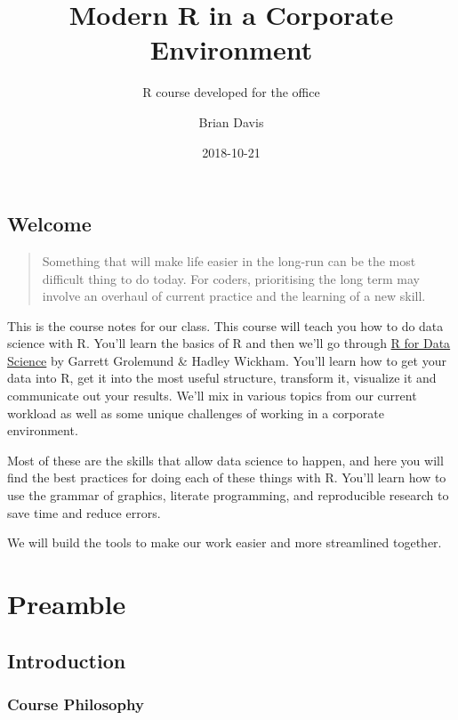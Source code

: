 \documentclass[]{book}
\title{Modern R in a Corporate Environment}
\subtitle{R course developed for the office}
\author{Brian Davis}
\date{2018-10-21}
\theoremstyle{definition}
\theoremstyle{definition}
\theoremstyle{definition}
\theoremstyle{remark}
\begin{document}
\maketitle

{
\setcounter{tocdepth}{1}
\tableofcontents
}
\hypertarget{welcome}{%
\chapter*{Welcome}\label{welcome}}

\begin{quote}
Something that will make life easier in the long-run can be the most
difficult thing to do today. For coders, prioritising the long term may
involve an overhaul of current practice and the learning of a new skill.
\end{quote}

This is the course notes for our class. This course will teach you how
to do data science with R. You'll learn the basics of R and then we'll
go through \href{http://r4ds.had.co.nz/index.html}{R for Data Science}
by Garrett Grolemund \& Hadley Wickham. You'll learn how to get your
data into R, get it into the most useful structure, transform it,
visualize it and communicate out your results. We'll mix in various
topics from our current workload as well as some unique challenges of
working in a corporate environment.

Most of these are the skills that allow data science to happen, and here
you will find the best practices for doing each of these things with R.
You'll learn how to use the grammar of graphics, literate programming,
and reproducible research to save time and reduce errors.

We will build the tools to make our work easier and more streamlined
together.

\hypertarget{part-preamble}{%
\part{Preamble}\label{part-preamble}}

\hypertarget{preamble-intro}{%
\chapter{Introduction}\label{preamble-intro}}

\hypertarget{course-philosophy}{%
\section{Course Philosophy}\label{course-philosophy}}
\end{document}
